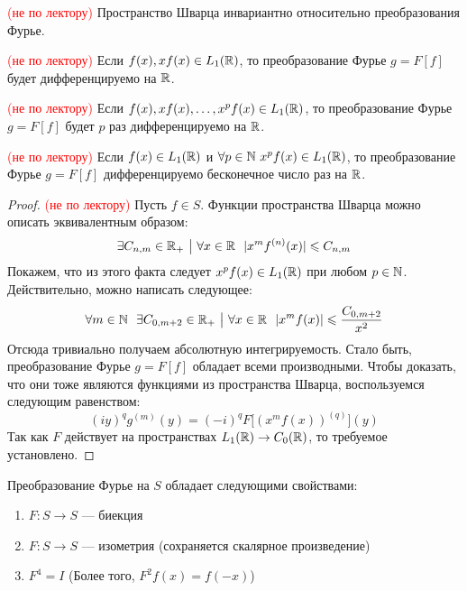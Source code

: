 \begin{proposition} \textcolor{red}{(не по лектору)}
	Пространство Шварца инвариантно относительно преобразования Фурье.
\end{proposition}

\begin{reminder} \textcolor{red}{(не по лектору)}
	Если $f(x), xf(x) \in L_1(\mathbb{R})$, то преобразование Фурье $g = F[f]$ будет дифференцируемо на $\mathbb{R}$.
\end{reminder}

\begin{corollary} \textcolor{red}{(не по лектору)}
	Если $f(x), xf(x), \ldots, x^pf(x) \in L_1(\mathbb{R})$, то преобразование Фурье $g = F[f]$ будет $p$ раз дифференцируемо на $\mathbb{R}$.
\end{corollary}

\begin{corollary} \textcolor{red}{(не по лектору)}
	Если $f(x) \in L_1(\mathbb{R})$ и $\forall p \in \mathbb{N}\ x^pf(x) \in L_1(\mathbb{R})$, то преобразование Фурье $g = F[f]$ дифференцируемо бесконечное число раз на $\mathbb{R}$.
\end{corollary}

\begin{proof} \textcolor{red}{(не по лектору)}
	Пусть $f \in S$. Функции пространства Шварца можно описать эквивалентным образом:
	\[
		\exists C_{n, m} \in \R_+ \such \forall x \in \R\ \ |x^mf^{(n)}(x)| \le C_{n, m}
	\]
	Покажем, что из этого факта следует $x^pf(x) \in L_1(\mathbb{R})$ при любом $p \in \mathbb{N}$. Действительно, можно написать следующее:
	\[
		\forall m \in \N\ \ \exists C_{0, m + 2} \in \R_+ \such \forall x \in \R\ \ |x^mf(x)| \le \frac{C_{0, m + 2}}{x^2}
	\]
	Отсюда тривиально получаем абсолютную интегрируемость. Стало быть, преобразование Фурье $g = F[f]$ обладает всеми производными. Чтобы доказать, что они тоже являются функциями из пространства Шварца, воспользуемся следующим равенством:
	\[
		(iy)^qg^{(m)}(y) = (-i)^qF\big[(x^mf(x))^{(q)}\big](y)
	\]
	Так как $F$ действует на пространствах $L_1(\mathbb{R}) \to C_0(\mathbb{R})$, то требуемое установлено.
\end{proof}

\begin{proposition}
	Преобразование Фурье на $S$ обладает следующими свойствами:
	\begin{enumerate}
		\item $F \colon S \to S$ --- биекция
		
		\item $F \colon S \to S$ --- изометрия (сохраняется скалярное произведение)
		
		\item $F^4 = I$ (Более того, $F^2f(x) = f(-x)$)
	\end{enumerate}
\end{proposition}

